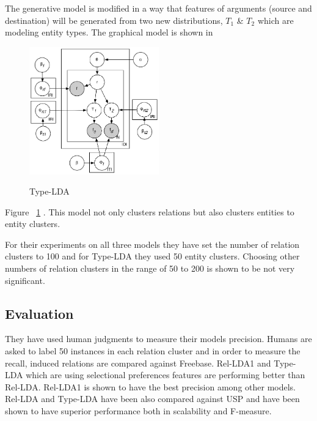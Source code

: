 \documentclass[12pt]{report}
\begin{document}
    The generative model is modified in a way that features of arguments (source and destination)
    will be generated from two new distributions, $T_1$ \& $T_2$ which are modeling entity types. The graphical model
    is shown in
     \begin{figure}[h!]
  \caption{Type-LDA}
  \centering
    \includegraphics[width=0.5\textwidth]{type-lda.eps}
    \label{fig:type-lda}
\end{figure} 
Figure ~\ref{fig:type-lda} .
    This model not only clusters relations but also clusters entities to entity clusters.
    
    For their experiments on all three models they have set the number of relation clusters to 100 and for Type-LDA they used 
     50 entity clusters. Choosing other numbers of relation clusters in the range of 50 to 200 is shown to be not very significant.
    
\subsection {Evaluation}
\label{ch:evaluation}

They have used human judgments 
 to measure their models precision. Humans are asked to label 50 instances in each relation cluster and in order to measure
 the recall, induced relations are compared against Freebase. Rel-LDA1 and Type-LDA which are using selectional preferences features
  are performing better than Rel-LDA. Rel-LDA1 is shown to have the best precision among other models. 
  Rel-LDA and Type-LDA have been also compared against
  USP and have been shown to have superior performance both in scalability and F-measure. 
 
\end{document}
